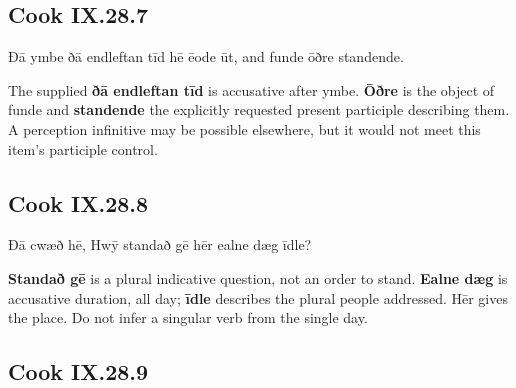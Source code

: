 \subsection*{Cook IX.28.7}

\par\begin{minipage}{\linewidth}\raggedright
Ðā ymbe ðā endleftan tīd hē ēode ūt, and funde ōðre standende.

The supplied \textbf{ðā endleftan tīd} is accusative after ymbe. \textbf{Ōðre} is the object of funde and \textbf{standende} the explicitly requested present participle describing them. A perception infinitive may be possible elsewhere, but it would not meet this item’s participle control.

\end{minipage}\par\addvspace{4pt}

\subsection*{Cook IX.28.8}

\par\begin{minipage}{\linewidth}\raggedright
Ðā cwæð hē, Hwȳ standað gē hēr ealne dæg īdle?

\textbf{Standað gē} is a plural indicative question, not an order to stand. \textbf{Ealne dæg} is accusative duration, all day; \textbf{īdle} describes the plural people addressed. Hēr gives the place. Do not infer a singular verb from the single day.

\end{minipage}\par\addvspace{4pt}

\subsection*{Cook IX.28.9}

